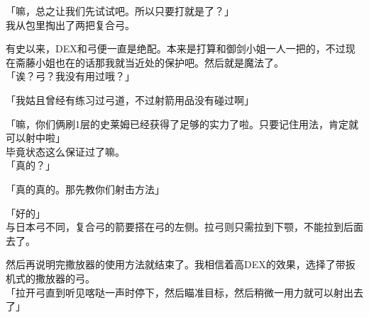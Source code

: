 「嘛，总之让我们先试试吧。所以只要打就是了？」\\

我从包里掏出了两把复合弓。

有史以来，DEX和弓便一直是绝配。本来是打算和御剑小姐一人一把的，不过现在斋藤小姐也在的话那我就当近处的保护吧。然后就是魔法了。\\

「诶？弓？我没有用过哦？」

「我姑且曾经有练习过弓道，不过射箭用品没有碰过啊」

「嘛，你们俩刷1层的史莱姆已经获得了足够的实力了啦。只要记住用法，肯定就可以射中啦」\\

毕竟状态这么保证过了嘛。\\

「真的？」

「真的真的。那先教你们射击方法」

「好的」\\

与日本弓不同，复合弓的箭要搭在弓的左侧。拉弓则只需拉到下颚，不能拉到后面去了。

然后再说明完撒放器的使用方法就结束了。我相信着高DEX的效果，选择了带扳机式的撒放器的弓。\\

「拉开弓直到听见喀哒一声时停下，然后瞄准目标，然后稍微一用力就可以射出去了」\\

